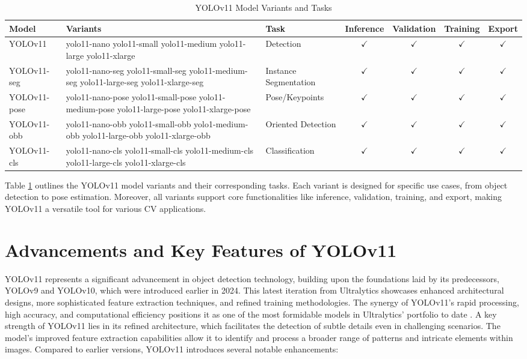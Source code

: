\documentclass{article}
\begin{document}
\begin{table}[ht]
\centering
\caption{YOLOv11 Model Variants and Tasks}
\label{tab:yolo_CVtasks}
\begin{tabular}{lp{4cm}p{2.5cm}cccc}
\hline
\textbf{Model} & \textbf{Variants} & \textbf{Task} & \textbf{Inference} & \textbf{Validation} & \textbf{Training} & \textbf{Export} \\
\hline
YOLOv11 & yolo11-nano yolo11-small yolo11-medium yolo11-large yolo11-xlarge & Detection & $\checkmark$ & $\checkmark$ & $\checkmark$ & $\checkmark$ \\
YOLOv11-seg & yolo11-nano-seg yolo11-small-seg yolo11-medium-seg yolo11-large-seg yolo11-xlarge-seg & Instance Segmentation & $\checkmark$ & $\checkmark$ & $\checkmark$ & $\checkmark$ \\
YOLOv11-pose & yolo11-nano-pose yolo11-small-pose yolo11-medium-pose yolo11-large-pose yolo11-xlarge-pose & Pose/Keypoints & $\checkmark$ & $\checkmark$ & $\checkmark$ & $\checkmark$ \\
YOLOv11-obb & yolo11-nano-obb yolo11-small-obb yolo1-medium-obb yolo11-large-obb yolo11-xlarge-obb & Oriented Detection & $\checkmark$ & $\checkmark$ & $\checkmark$ & $\checkmark$ \\
YOLOv11-cls & yolo11-nano-cls yolo11-small-cls yolo11-medium-cls yolo11-large-cls yolo11-xlarge-cls & Classification & $\checkmark$ & $\checkmark$ & $\checkmark$ & $\checkmark$ \\
\hline
\end{tabular}
\end{table}

Table \ref{tab:yolo_CVtasks} outlines the YOLOv11 model variants and their corresponding tasks. Each variant is designed for specific use cases, from object detection to pose estimation. Moreover, all variants support core functionalities like inference, validation, training, and export, making YOLOv11 a versatile tool for various CV applications.

\section{Advancements and Key Features of YOLOv11}
YOLOv11 represents a significant advancement in object detection technology, building upon the foundations laid by its predecessors, YOLOv9 and YOLOv10, which were introduced earlier in 2024. This latest iteration from Ultralytics showcases enhanced architectural designs, more sophisticated feature extraction techniques, and refined training methodologies. The synergy of YOLOv11's rapid processing, high accuracy, and computational efficiency positions it as one of the most formidable models in Ultralytics' portfolio to date \cite{visoaiyolov11}. A key strength of YOLOv11 lies in its refined architecture, which facilitates the detection of subtle details even in challenging scenarios. The model's improved feature extraction capabilities allow it to identify and process a broader range of patterns and intricate elements within images. Compared to earlier versions, YOLOv11 introduces several notable enhancements:
\end{document}
